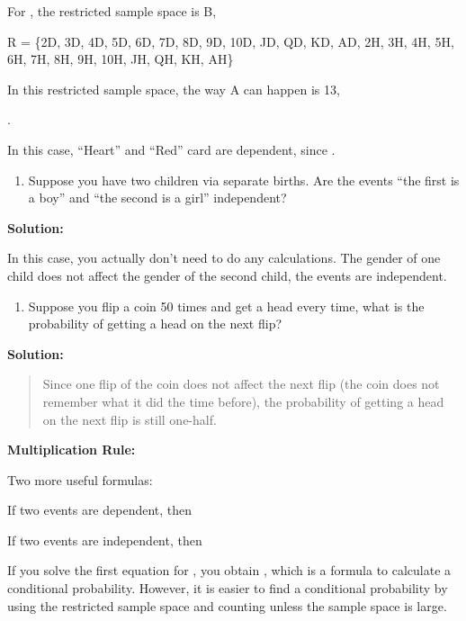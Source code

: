 \documentclass[]{book}
\providecommand{\tightlist}{%
  \setlength{\itemsep}{0pt}\setlength{\parskip}{0pt}}
\begin{document}
For , the restricted sample space is B,

R = \{2D, 3D, 4D, 5D, 6D, 7D, 8D, 9D, 10D, JD, QD, KD, AD, 2H, 3H,
4H, 5H, 6H, 7H, 8H, 9H, 10H, JH, QH, KH, AH\}

In this restricted sample space, the way A can happen is 13,

.

In this case, ``Heart'' and ``Red'' card are dependent, since .

\begin{enumerate}
\def\labelenumi{\alph{enumi}.}
\setcounter{enumi}{4}
\tightlist
\item
  Suppose you have two children via separate births. Are the events
  ``the first is a boy'' and ``the second is a girl'' independent?
\end{enumerate}

\textbf{Solution:}

In this case, you actually don't need to do any calculations. The
gender of one child does not affect the gender of the second child,
the events are independent.

\begin{enumerate}
\def\labelenumi{\alph{enumi}.}
\setcounter{enumi}{5}
\tightlist
\item
  Suppose you flip a coin 50 times and get a head every time, what is
  the probability of getting a head on the next flip?
\end{enumerate}

\textbf{Solution:}

\begin{quote}
Since one flip of the coin does not affect the next flip (the coin
does not remember what it did the time before), the probability of
getting a head on the next flip is still one-half.
\end{quote}

\textbf{Multiplication Rule:}

Two more useful formulas:

If two events are dependent, then

If two events are independent, then

If you solve the first equation for , you obtain , which is a formula to
calculate a conditional probability. However, it is easier to find a
conditional probability by using the restricted sample space and
counting unless the sample space is large.

\textbf{\\
}
\end{document}
